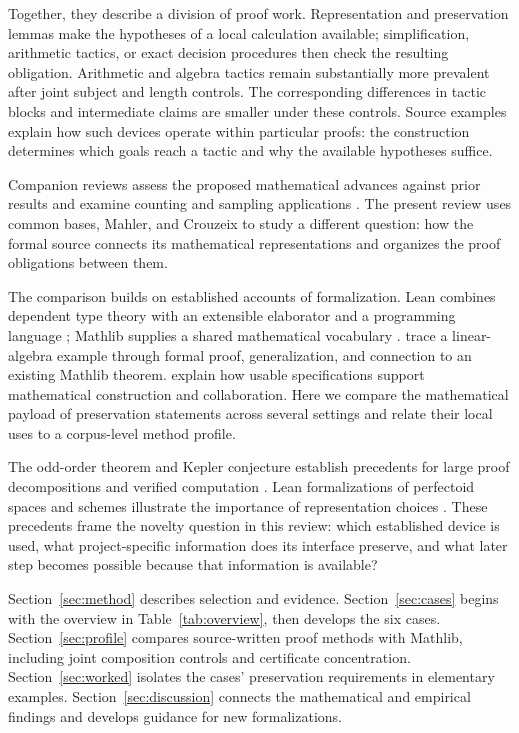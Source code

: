 Together, they describe a division of proof work. Representation and
preservation lemmas make the hypotheses of a local calculation available;
simplification, arithmetic tactics, or exact decision procedures then
check the resulting obligation. Arithmetic and algebra tactics remain
substantially more prevalent after joint subject and length controls.
The corresponding differences in tactic blocks and intermediate claims
are smaller under these controls. Source examples explain how such
devices operate within particular proofs: the construction determines
which goals reach a tactic and why the available hypotheses suffice.

Companion reviews assess the proposed mathematical advances against
prior results \citep{GounderFrontiers2026} and examine counting and
sampling applications \citep{GounderCounting2026}. The present review
uses common bases, Mahler, and Crouzeix to study a different question:
how the formal source connects its mathematical representations and
organizes the proof obligations between them.

The comparison builds on established accounts of formalization. Lean
combines dependent type theory with an extensible elaborator and a
programming language \citep{deMouraUllrich2021}; Mathlib supplies a shared
mathematical vocabulary \citep{mathlib2020}.
\citet{AvigadEtAl2024Anatomy} trace a linear-algebra example through
formal proof, generalization, and connection to an existing Mathlib
theorem. \citet{CommelinTopaz2024} explain how usable specifications
support mathematical construction and collaboration. Here we compare
the mathematical payload of preservation statements across several
settings and relate their local uses to a corpus-level method profile.

The odd-order theorem and Kepler conjecture establish precedents for
large proof decompositions and verified computation
\citep{GonthierEtAl2013,HalesEtAl2017}. Lean formalizations of perfectoid
spaces and schemes illustrate the importance of representation choices
\citep{Perfectoid2020,Schemes2021}. These precedents frame the novelty
question in this review: which established device is used, what
project-specific information does its interface preserve, and what later
step becomes possible because that information is available?

Section~\ref{sec:method} describes selection and evidence.
Section~\ref{sec:cases} begins with the overview in
Table~\ref{tab:overview}, then develops the six cases.
Section~\ref{sec:profile} compares source-written proof methods with
Mathlib, including joint composition controls and certificate
concentration. Section~\ref{sec:worked} isolates the cases' preservation
requirements in elementary examples. Section~\ref{sec:discussion}
connects the mathematical and empirical findings and develops guidance
for new formalizations.
